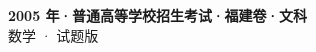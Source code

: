 \documentclass[zihao=-4, a4paper]{ctexart}
\begin{document}
\begin{center}
  {\Large\bfseries 2005 年·普通高等学校招生考试·福建卷·文科}\\[4pt]
  {\large 数学 · 试题版}
\end{center}
\medskip
{}

\end{document}
